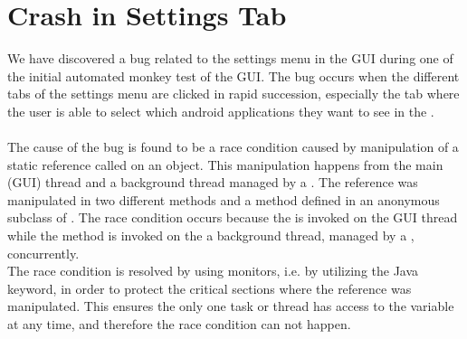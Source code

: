\section{Crash in Settings Tab}
\label{sec:crash_in_settings_tab}

We have discovered a bug related to the settings menu in the \launcher GUI during one of the initial automated monkey test of the GUI. The bug occurs when the different tabs of the settings menu are clicked in rapid succession, especially the tab where the user is able to select which android applications they want to see in the \giraf \launcher.
\\\\
The cause of the bug is found to be a race condition caused by manipulation of a static reference called  on an  object. This manipulation happens from the main (GUI) thread and a background thread managed by a . The reference was manipulated in two different methods  and a method  defined in an anonymous subclass of . The race condition occurs because the  is invoked on the GUI thread while the  method is invoked on the a background thread, managed by a , concurrently. \\

The race condition is resolved by using monitors, i.e. by utilizing the  Java keyword, in order to protect the critical sections where the  reference was manipulated. This ensures the only one task or thread has access to the variable at any time, and therefore the race condition can not happen.



